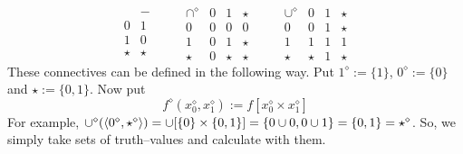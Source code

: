 \begin{equation}
\begin{array}{l|l}
        & - \\\hline
0       & 1 \\
1       & 0 \\
\star   &  \star
\end{array}
\qquad
\begin{array}{l|lll}
\cap^{\diamond}    & 0     & 1     & \star \\\hline
0         & 0     & 0     & 0     \\
1         & 0     & 1     & \star \\
\star     & 0     & \star & \star
\end{array}
\qquad
\begin{array}{l|lll}
\cup^{\diamond}  & 0     & 1     & \star \\\hline
0       & 0     & 1     & \star \\
1       & 1     & 1     & 1     \\
\star   & \star & 1     & \star
\end{array}
\end{equation}
These connectives can be defined in the following way.
Put $1^{\diamond} := \{1\}$, $0^{\diamond} := \{0\}$
and $\star := \{0,1\}$. Now put
\begin{equation}
f^{\diamond}(x_0^{\diamond},x_1^{\diamond}) :=
f[x_0^{\diamond} \times x_1^{\diamond}]
\end{equation}
For example, $\cup^{\diamond}(\langle 0^{\diamond},\star^{\diamond}\rangle)
= \cup[\{0\} \times \{0,1\}] = \{0 \cup 0, 0 \cup 1\} = \{0,1\} =
\star^{\diamond}$. So, we simply take sets of truth--values and
calculate with them.

